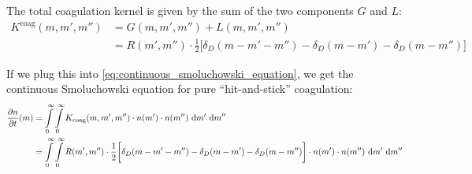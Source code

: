 

    The total coagulation kernel is given by the sum of the two components $G$ and $L$:
    \begin{align}
        K^\text{coag}(m,m',m'') 
        &= G(m,m',m'') + L(m,m',m'')
        \\
        &= R(m',m'') \cdot \frac{1}{2}
        \bigg[
            \delta_D(m-m'-m'') - \delta_D(m-m') - \delta_D(m-m'')
        \bigg]
    \end{align}

    If we plug this into \cref{eq:continuous_smoluchowski_equation}, we get the 
    continuous Smoluchowski equation for pure ``hit-and-stick'' coagulation:
    \begin{align}
        \frac{\partial n}{\partial t}(m)
            &=
                \int\limits_0^\infty
                \int\limits_0^\infty
                K_\text{coag}(m,m',m'')
                \cdot n(m')
                \cdot n(m'')
                \ \text{d} m'
                \ \text{d} m''
        \\
            &=
                \int\limits_0^\infty
                \int\limits_0^\infty
                R(m',m'') \cdot \frac{1}{2}
                \bigg[
                    \delta_D(m-m'-m'') - \delta_D(m-m') - \delta_D(m-m'')
                \bigg]
                \cdot n(m')
                \cdot n(m'')
                \ \text{d} m'
                \ \text{d} m''
    \end{align}

